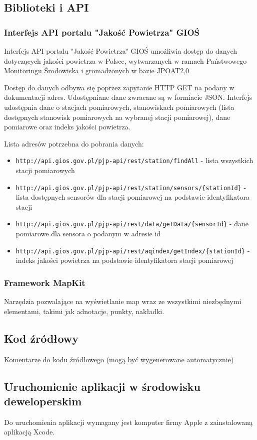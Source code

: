 \documentclass[a4paper,11pt,titlepage]{article}
\begin{document}
\subsection{Biblioteki i API}
\subsubsection{Interfejs API portalu "Jakość Powietrza"  GIOŚ}
Interfejs API portalu "Jakość Powietrza"  GIOŚ umożliwia dostęp do danych dotyczących jakości powietrza w Polsce, wytwarzanych w ramach Państwowego Monitoringu Środowiska i gromadzonych w bazie JPOAT2,0

Dostęp do danych odbywa się poprzez zapytanie HTTP GET na podany w dokumentacji adres. Udostępniane dane zwracane są w formiacie JSON. Interfejs udostępnia dane o stacjach pomiarowych, stanowiskach pomiarowych (lista dostępnych stanowisk pomiarowych na wybranej stacji pomiarowej), dane pomiarowe oraz indeks jakości powietrza.

Lista adresów potrzebna do pobrania danych:
\begin{itemize}
 	\item \verb|http://api.gios.gov.pl/pjp-api/rest/station/findAll| - lista wszystkich stacji pomiarowych
	\item \verb|http://api.gios.gov.pl/pjp-api/rest/station/sensors/{stationId}| - lista dostępnych sensorów dla stacji pomiarowej na podstawie identyfikatora stacji
	\item \verb|http://api.gios.gov.pl/pjp-api/rest/data/getData/{sensorId}| - dane pomiarowe dla sensora o podanym w adresie id
	\item \verb|http://api.gios.gov.pl/pjp-api/rest/aqindex/getIndex/{stationId}| - indeks jakości powietrza na podstawie identyfikatora stacji pomiarowej
\end{itemize}
\subsubsection{Framework MapKit}
Narzędzia pozwalające na wyświetlanie map wraz ze wszystkimi niezbędnymi elementami, takimi jak adnotacje, punkty, nakładki.

\subsection{Kod źródłowy}
Komentarze do kodu źródłowego (mogą być wygenerowane automatycznie)
\subsection{Uruchomienie aplikacji w środowisku deweloperskim}
Do uruchomienia aplikacji wymagany jest komputer firmy Apple z zainstalowaną aplikacją Xcode.
\end{document}
